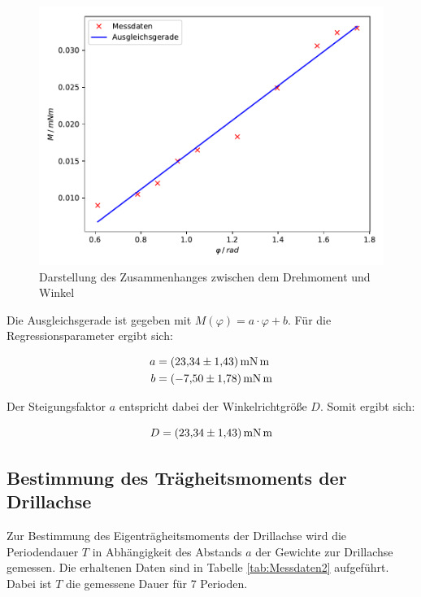 \begin{figure}
  \centering
  \includegraphics[scale=0.8]{content/plot1.pdf}
  \caption{Darstellung des Zusammenhanges zwischen dem Drehmoment und Winkel}
  \label{fig:plot1}
\end{figure}

Die Ausgleichsgerade ist gegeben mit $M(\varphi) = a\cdot \varphi + b$. Für die Regressionsparameter
ergibt sich: 

\begin{align*}
a &= \SI{23.34+-1.43}{\milli\newton\meter} \\
b &= \SI{-7.5+-1.78}{\milli\newton\meter}
\end{align*}

Der Steigungsfaktor $a$ entspricht dabei der Winkelrichtgröße $D$. Somit ergibt sich: 

\begin{equation*}
D = \SI{23.34+-1.43}{\milli\newton\meter}
\end{equation*}

\subsection{Bestimmung des Trägheitsmoments der Drillachse}

Zur Bestimmung des Eigenträgheitsmoments der Drillachse wird die Periodendauer $T$ in Abhängigkeit 
des Abstands $a$ der Gewichte zur Drillachse gemessen. Die erhaltenen Daten sind in Tabelle 
\ref{tab:Messdaten2} aufgeführt. Dabei ist $T$ die gemessene Dauer für 7 Perioden.

